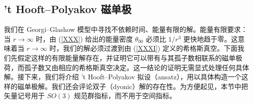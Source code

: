 
\subsection{'t Hooft–Polyakov 磁单极}

我们在 Georgi–Glashow 模型中寻找不依赖时间、能量有限的解。能量有限要求：当 $r\rightarrow \infty$ 时，由 (\ref{XXX}) 给出的能量密度 $\theta_{00}$ 必须比 $1/r^3$ 更快地趋于零。这意味着当 $r\rightarrow \infty$ 时，我们的解必须过渡到由 (\ref{XXXI}) 定义的希格斯真空。下面我们先假定这样的有限能量解存在，并证明它可以带有与其孤子数相联系的磁单极荷，而孤子数又由相应的希格斯真空决定。这一结论的证明无需显式处理任何具体解。接下来，我们将介绍 't Hooft–Polyakov 拟设（ansatz），用以具体构造一个这样的磁单极解。我们还会评论双子（dyonic）解的存在性。为方便起见，本节中把矢量记号用于 $SO(3)$ 规范群指标，而不用于空间指标。


